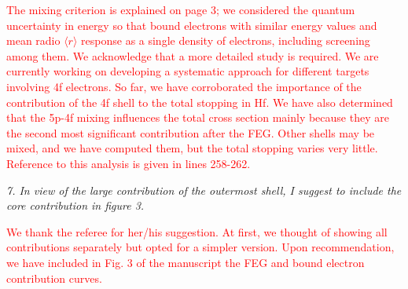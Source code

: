 \documentclass[a4paper,10pt]{article}
\def\reviewer#1{\vspace{0.35cm}\textsl{#1}}
\def\reply#1{\vspace{0.1cm}\textcolor{red}{#1}}
\begin{document}
\reply{The mixing criterion is explained on page 3; we considered
the quantum uncertainty in energy so that bound electrons with similar
energy values and mean radio $\langle r\rangle$ response as a single
density of electrons, including screening among them. We acknowledge
that a more detailed study is required. We are currently working on
developing a systematic approach for different targets involving 4f
electrons. So far, we have corroborated the importance of the
contribution of the 4f shell to the total stopping in Hf. We have also
determined that the 5p-4f mixing influences the total cross section
mainly because they are the second most significant contribution after
the FEG. Other shells may be mixed, and we have computed them, but the
total stopping varies very little. Reference to this analysis is given
in lines 258-262.}

\reviewer{7. In view of the large contribution of the outermost shell, 
I suggest to include the core contribution in figure 3.}

\reply{We thank the referee for her/his suggestion. At first, we thought 
of showing all contributions separately but opted for a simpler version.
Upon recommendation, we have included in Fig. 3 of the manuscript the
FEG and bound electron contribution curves.}
\end{document}
